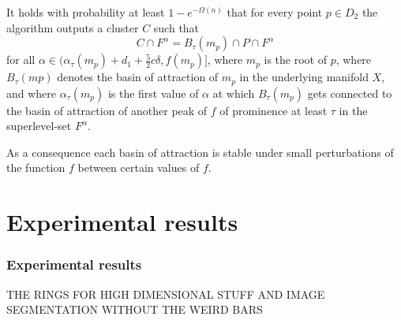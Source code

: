\documentclass{beamer}
\theoremstyle{definition}
\begin{document}
\begin{frame}
\begin{theorem}
 It holds with probability at least $1 - e^{-\Omega(n)}$ that for every point $p \in D_2$ the algorithm outputs
a cluster $C$ such that \[C \cap F^\alpha = B_\tau (m_p) \cap P \cap F^\alpha\] for all $\alpha \in(\alpha_\tau (m_p) + d_1 +
\frac{5}{2}c\delta, f(m_p)]$, where $m_p$ is the root of $p$, where $B_\tau (mp)$ denotes 
the basin of attraction of $m_p$ in the underlying manifold $X$, and where $\alpha_\tau(m_p)$ is the first value of $\alpha$ at which $B_\tau(m_p)$ gets connected to the basin of attraction of another peak of
$f$ of prominence at least $\tau$ in the superlevel-set $F^\alpha$.
\end{theorem}\pause
As a consequence each basin of attraction is stable under small perturbations of the function $f$ between certain values of $f$. %
\end{frame}
\section{Experimental results}
\begin{frame}
\frametitle{Experimental results}
THE RINGS FOR HIGH DIMENSIONAL STUFF AND IMAGE SEGMENTATION WITHOUT THE WEIRD BARS
\end{frame}
\end{document}
